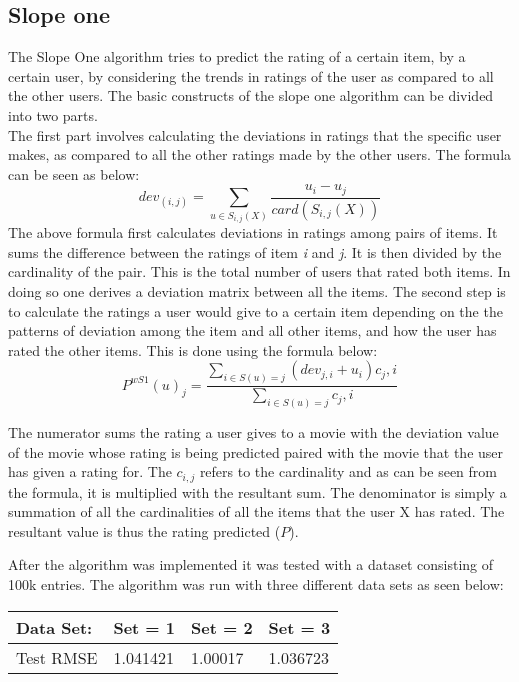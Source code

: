 \documentclass[a4paper]{article}
\begin{document}
\subsection{Slope one}
The Slope One algorithm tries to predict the rating of a certain item, by a certain user, by considering the trends in ratings of the user as compared to all the other users. The basic constructs of the slope one algorithm can be divided into two parts. \\
The first part involves calculating the deviations in ratings that the specific user makes, as compared to all the other ratings made by the other users. The formula can be seen as below:
$$ dev_{(i,j)} = \sum_{u\in S_{i,j}(X)}\frac{u_i - u_j}{card(S_{i,j}(X))}$$
The above formula first calculates deviations in ratings among pairs of items. It sums the difference between the ratings of item \textit{i} and \textit{j}. It is then divided by the cardinality of the pair. This is the total number of users that rated both items. In doing so one derives a deviation matrix between all the items.
The second step is to calculate the ratings a user would give to a certain item depending on the the patterns of deviation among the item and all other items, and how the user has rated the other items. This is done using the formula below:
$$P^{wS1}(u)_j = \frac{\sum_{i \in S(u) = j}(dev_{j,i} +u_i)c_j,i}{\sum_{i \in S(u) = j}c_j,i}$$

The numerator sums the rating a user gives to a movie with the deviation value of the movie whose rating is being predicted paired with the movie that the user has given a rating for. The $c_{i,j}$ refers to the cardinality and as can be seen from the formula, it is multiplied with the resultant sum. The denominator is simply a summation of all the cardinalities of all the items that the user X has rated.  The resultant value is thus the rating predicted ($P$). 

After the algorithm was implemented it was tested with a dataset consisting of 100k entries. The algorithm was run with three different data sets as seen below: 

\begin{center}
    \begin{tabular}{| l | l | l | l |}
    \hline
    Data Set:& Set = 1 & Set = 2 & Set = 3  \\ \hline
    Test RMSE & 1.041421 & 1.00017 & 1.036723  \\ \hline
    \hline
    \end{tabular}
\end{center}
\end{document}
